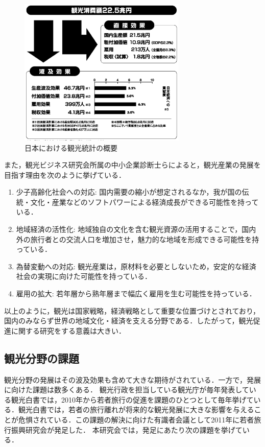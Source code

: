 \documentclass{jsarticle}
\begin{document}
\begin{figure}[h!]
\begin{center}
\includegraphics[width=8.0cm]{./image/tourism_kibo.png}
\caption{日本における観光統計の概要\cite{tourism_stat}}
\label{tourism_kibo}
\end{center}
\end{figure}

また，観光ビジネス研究会所属の中小企業診断士らによると，観光産業の発展を目指す理由を次のように挙げている\cite{tourism_future}．

\begin{enumerate}
\item 少子高齢化社会への対応: 国内需要の縮小が想定されるなか，我が国の伝統・文化・産業などのソフトパワーによる経済成長ができる可能性を持っている．
\item 地域経済の活性化: 地域独自の文化を含む観光資源の活用することで，国内外の旅行者との交流人口を増加させ，魅力的な地域を形成できる可能性を持っている．
\item 為替変動への対応: 観光産業は，原材料を必要としないため，安定的な経済社会の実現に向けた可能性を持っている．
\item 雇用の拡大: 若年層から熟年層まで幅広く雇用を生む可能性を持っている．
\end{enumerate}


以上のように，観光は国家戦略，経済戦略として重要な位置づけとされており，国内のみならず世界の地域文化・経済を支える分野である．したがって，観光促進に関する研究をする意義は大きい．

\subsection{観光分野の課題}

観光分野の発展はその波及効果も含めて大きな期待がされている．一方で，発展に向けた課題は数多くある．
観光行政を担当している観光庁が毎年発表している観光白書では，2010年から若者旅行の促進を課題のひとつとして毎年挙げている\cite{kanko_hakusho_2009}\cite{kanko_hakusho_2010}\cite{kanko_hakusho_2011}\cite{kanko_hakusho_2012}\cite{kanko_hakusho_2013}\cite{kanko_hakusho_2014}．観光白書では，若者の旅行離れが将来的な観光発展に大きな影響を与えることが危惧されている．この課題の解決に向けた有識者会議として2011年に若者旅行振興研究会が発足した．
本研究会では，発足にあたり次の課題を挙げている\cite{wakamono_shinko}．
\end{document}
